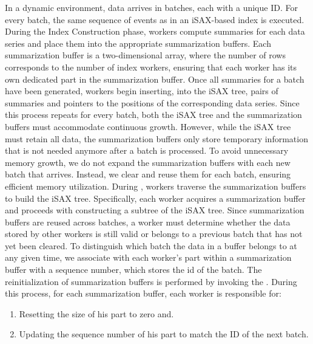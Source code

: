 In a dynamic environment, data arrives in batches, each with a unique ID. For every
batch, the same sequence of events as in an iSAX-based index is executed.
During the Index Construction phase, workers compute summaries for each data series and
place them into the appropriate summarization buffers. Each summarization buffer is a 
two-dimensional array, where the number of rows corresponds to the number of index workers,
ensuring that each worker has its own dedicated part in the summarization buffer.
% 
Once all summaries for a batch have been generated, workers begin inserting, into the iSAX 
tree, pairs of summaries and pointers to the positions of the corresponding data series.
% 
Since this process repeats for every batch, both the iSAX tree and the
summarization buffers must accommodate continuous growth. However, while the iSAX tree
must retain all data, the summarization buffers only store temporary information that
is not needed anymore after a batch is processed. To avoid unnecessary memory growth,
we do not expand the summarization buffers with each new batch that arrives.
Instead, we clear and reuse them for each batch, ensuring efficient memory utilization. 
\newline {} 
During \TP, workers traverse the summarization buffers to build the iSAX tree.
Specifically, each worker acquires a summarization buffer and proceeds with
constructing a subtree of the iSAX tree. Since summarization buffers are reused
across batches, a worker must determine whether the data stored by other workers
is still valid or belongs to a previous batch that has not yet been cleared.
To distinguish which batch the data in a buffer belongs to at any given time, we
associate with each worker's part within a summarization buffer with a
sequence number, which stores the id of the batch.
The reinitialization of summarization buffers is performed by invoking the 
\textit{\TPCLEAN}.  
During this process, for each summarization buffer, each worker is responsible for:
\begin{enumerate} [noitemsep, topsep=3pt, partopsep=0pt, parsep=0pt]
    \item Resetting the size of his part to zero and.
    \item Updating the sequence number of his part to match the ID of the next batch.
\end{enumerate}

